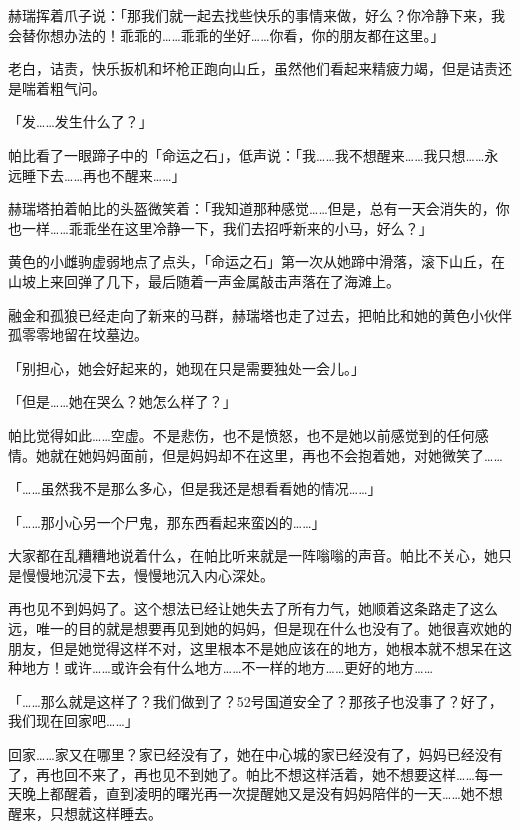 赫瑞挥着爪子说：「那我们就一起去找些快乐的事情来做，好么？你冷静下来，我会替你想办法的！乖乖的……乖乖的坐好……你看，你的朋友都在这里。」

老白，诘责，快乐扳机和坏枪正跑向山丘，虽然他们看起来精疲力竭，但是诘责还是喘着粗气问。

「发……发生什么了？」

帕比看了一眼蹄子中的「命运之石」，低声说：「我……我不想醒来……我只想……永远睡下去……再也不醒来……」

赫瑞塔拍着帕比的头盔微笑着：「我知道那种感觉……但是，总有一天会消失的，你也一样……乖乖坐在这里冷静一下，我们去招呼新来的小马，好么？」

黄色的小雌驹虚弱地点了点头，「命运之石」第一次从她蹄中滑落，滚下山丘，在山坡上来回弹了几下，最后随着一声金属敲击声落在了海滩上。

\horizonline


融金和孤狼已经走向了新来的马群，赫瑞塔也走了过去，把帕比和她的黄色小伙伴孤零零地留在坟墓边。

「别担心，她会好起来的，她现在只是需要独处一会儿。」

「但是……她在哭么？她怎么样了？」

帕比觉得如此……空虚。不是悲伤，也不是愤怒，也不是她以前感觉到的任何感情。她就在她妈妈面前，但是妈妈却不在这里，再也不会抱着她，对她微笑了……{}

「……虽然我不是那么多心，但是我还是想看看她的情况……」

「……那小心另一个尸鬼，那东西看起来蛮凶的……」

大家都在乱糟糟地说着什么，在帕比听来就是一阵嗡嗡的声音。帕比不关心，她只是慢慢地沉浸下去，慢慢地沉入内心深处。

再也见不到妈妈了。这个想法已经让她失去了所有力气，她顺着这条路走了这么远，唯一的目的就是想要再见到她的妈妈，但是现在什么也没有了。她很喜欢她的朋友，但是她觉得这样不对，这里根本不是她应该在的地方，她根本就不想呆在这种地方！或许……或许会有什么地方……不一样的地方……更好的地方……{}

「……那么就是这样了？我们做到了？52号国道安全了？那孩子也没事了？好了，我们现在回家吧……」

回家……家又在哪里？家已经没有了，她在中心城的家已经没有了，妈妈已经没有了，再也回不来了，再也见不到她了。帕比不想这样活着，她不想要这样……每一天晚上都醒着，直到凌明的曙光再一次提醒她又是没有妈妈陪伴的一天……她不想醒来，只想就这样睡去。


